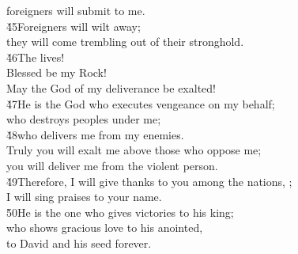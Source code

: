\begin{poetry}
\poemll    foreigners will submit to me. \\
\poeml \v{45}Foreigners will wilt away; \\
\poemll    they will come trembling out of their stronghold. \\
\poeml \v{46}The  lives! \\
\poemll    Blessed be my Rock! \\
\poemlll       May the God of my deliverance be exalted! \\
\poeml \v{47}He is the God who executes vengeance on my behalf; \\
\poemll    who destroys peoples under me; \\
\poeml \v{48}who delivers me from my enemies. \\
\poemll    Truly you will exalt me above those who oppose me; \\
\poemlll       you will deliver me from the violent person. \\
\poeml \v{49}Therefore, I will give thanks to you among the nations, ; \\
\poemll    I will sing praises to your name. \\
\poeml \v{50}He is the one who gives victories to his king; \\
\poemll    who shows gracious love to his anointed, \\
\poemlll       to David and his seed forever.
\end{poetry}

